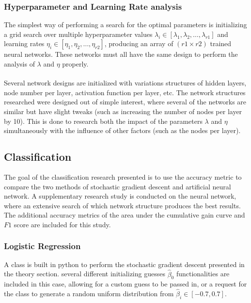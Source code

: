 %            
        \subsubsection{Hyperparameter and Learning Rate analysis}
            The simplest way of performing a search for the optimal parameters is initializing a grid search over multiple hyperparameter values $\lambda_i \in [\lambda_1, \lambda_2, \hdots, \lambda_{r1}]$ and learning rates $\eta_i \in [\eta_1, \eta_2, \hdots, \eta_{r2}]$, producing an array of $(r1 \times r2)$ trained neural networks. These networks must all have the same design to perform the analysis of $\lambda$ and $\eta$ properly.\\\\
            Several network designs are initialized with variations structures of hidden layers, node number per layer, activation function per layer, etc. The network structures researched were designed out of simple interest, where several of the networks are similar but have slight tweaks (such as increasing the number of nodes per layer by 10). This is done to research both the impact of the parameters $\lambda$ and $\eta$ simultaneously with the influence of other factors (such as the nodes per layer).
          
    \subsection{Classification}
        The goal of the classification research presented is to use the accuracy metric to compare the two methods of stochastic gradient descent and artificial neural network. A supplementary research study is conducted on the neural network, where an extensive search of which network structure produces the best results. The additional accuracy metrics of the area under the cumulative gain curve and $F1$ score are included for this study.
        \subsubsection{Logistic Regression}
            A class is built in python to perform the stochastic gradient descent presented in the theory section. several different initializing guesses $\hat{\beta}_0$ functionalities are included in this case, allowing for a custom guess to be passed in, or a request for the class to generate a random uniform distribution from $\hat{\beta}_i \in [-0.7, 0.7]$.
            
